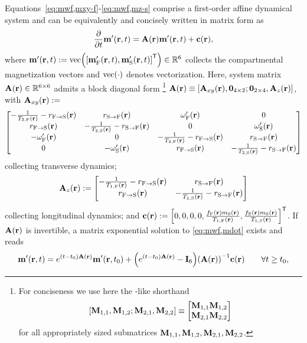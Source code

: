 Equations~\eqref{eq:mwf,mxy-f}-\eqref{eq:mwf,mz-s}
comprise a first-order affine dynamical system
and can be equivalently and concisely written
in matrix form as
\begin{align}
	\dela{t} \bmmp\prt = \bmA\pr \bmmp\prt + \bmc\pr,
	\label{eq:mwf,mdot}
\end{align}	
where $\bmmp\prt := \vect{\brac{\bmmpf\prt, \bmmps\prt}\tpose} \in \reals{6}$
collects the compartmental magnetization vectors
and $\vect{\cdot}$ denotes vectorization.
Here,
system matrix $\bmA\pr \in \reals{6 \times 6}$ 
admits a block diagonal form
\footnote{%
	For conciseness we use here 
	the \matlab-like shorthand 
	$$\brac{\bmM_{1,1}, \bmM_{1,2}; \bmM_{2,1}, \bmM_{2,2}} 
		\equiv
		\begin{bmatrix}
			\bmM_{1,1} \bmM_{1,2} \\
			\bmM_{2,1} \bmM_{2,2}
		\end{bmatrix}$$
	for all appropriately sized submatrices 
	$\mathbf{M}_{1,1}, \mathbf{M}_{1,2}, \mathbf{M}_{2,1}, \mathbf{M}_{2,2}$.
}
$\bmA\pr \equiv \brac{\bmAxy\pr, \zeros{4 \times 2}; \zeros{2 \times 4}, \bmAz\pr}$,
with $\bmAxy\pr :=$
\begin{align}
	\begin{bmatrix}
		-\frac{1}{\tf{2}\pr}-\rfs\pr & \rsf\pr & \ompf\pr & 0 \\
		\rfs\pr & -\frac{1}{\ts{2}\pr}-\rsf\pr & 0 & \omps\pr \\
		-\ompf\pr & 0 & -\frac{1}{\tf{2}\pr}-\rfs\pr & \rsf\pr \\
		0 & -\omps\pr & \rfs\pr & -\frac{1}{\ts{2}\pr}-\rsf\pr 
	\end{bmatrix}
	\label{eq:mwf,Axy}
\end{align}
collecting transverse dynamics;
\begin{align}
	\bmAz\pr :=
	\begin{bmatrix}
		-\frac{1}{\tf{1}\pr}-\rfs\pr & \rsf\pr \\
		\rfs\pr & -\frac{1}{\ts{1}\pr}-\rsf\pr
		\label{eq:mwf,Az}
	\end{bmatrix}
\end{align}
collecting longitudinal dynamics; and
$\bmc\pr := \brac{0, 0, 0, 0, 
\frac{\ff\pr \mzero\pr}{\tf{1}\pr}, 
\frac{\fs\pr \mzero\pr}{\ts{1}\pr}}\tpose$.
If $\bmA\pr$ is invertible,
a matrix exponential solution 
to \eqref{eq:mwf,mdot}
exists and reads
\begin{align}
	\bmmp\prt = e^{\paren{t-t_0}\bmA\pr} \bmmp\prtz +
		\paren{e^{\paren{t-t_0}\bmA\pr} - \eye{6}} \inv{\bmA\pr} \bmc\pr
		\qquad \forall t \geq t_0,
		\label{eq:mwf,epr}
\end{align}
